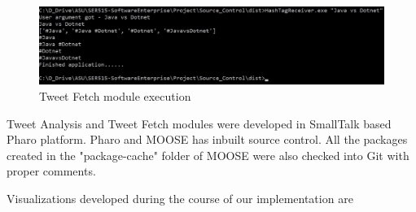 \documentclass[11pt]{article}
\begin{document}
\begin{figure}[h]
\centering
\includegraphics[width=\textwidth]{TweetFetchImp.jpg}
\caption{Tweet Fetch module execution}
\end{figure}

Tweet Analysis and Tweet Fetch modules were developed in SmallTalk based Pharo platform. Pharo and MOOSE has inbuilt source control. All the packages created in the "package-cache" folder of MOOSE were also checked into Git with proper comments.

Visualizations developed during the course of our implementation are
\end{document}
